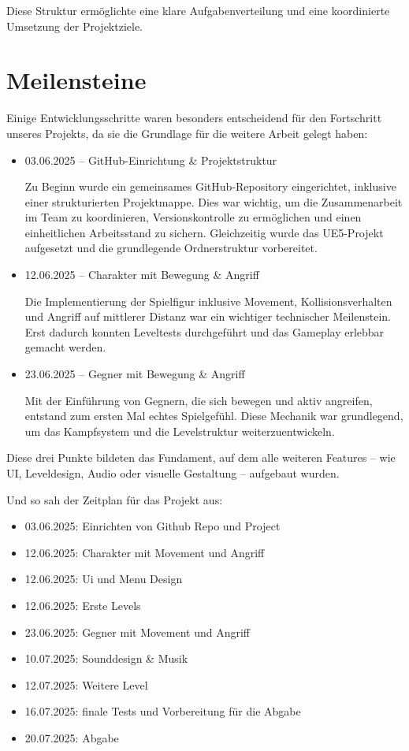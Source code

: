 \documentclass[oneside]{ausarbeitung}
\begin{document}
Diese Struktur ermöglichte eine klare Aufgabenverteilung und eine koordinierte Umsetzung der Projektziele.


\section{Meilensteine}
\label{sec:meilensteine}

Einige Entwicklungsschritte waren besonders entscheidend für den Fortschritt unseres Projekts, da sie die Grundlage für die weitere Arbeit gelegt haben:

\begin{itemize}
    \item 03.06.2025 – GitHub-Einrichtung & Projektstruktur
    
    Zu Beginn wurde ein gemeinsames GitHub-Repository eingerichtet, inklusive einer strukturierten Projektmappe. Dies war wichtig, um die Zusammenarbeit im Team zu koordinieren, Versionskontrolle zu ermöglichen und einen einheitlichen Arbeitsstand zu sichern. Gleichzeitig wurde das UE5-Projekt aufgesetzt und die grundlegende Ordnerstruktur vorbereitet.
    
    \item 12.06.2025 – Charakter mit Bewegung & Angriff
    
    Die Implementierung der Spielfigur inklusive Movement, Kollisionsverhalten und Angriff auf mittlerer Distanz war ein wichtiger technischer Meilenstein. Erst dadurch konnten Leveltests durchgeführt und das Gameplay erlebbar gemacht werden.
    
    \item 23.06.2025 – Gegner mit Bewegung & Angriff
    
    Mit der Einführung von Gegnern, die sich bewegen und aktiv angreifen, entstand zum ersten Mal echtes Spielgefühl. Diese Mechanik war grundlegend, um das Kampfsystem und die Levelstruktur weiterzuentwickeln.
\end{itemize}

Diese drei Punkte bildeten das Fundament, auf dem alle weiteren Features – wie UI, Leveldesign, Audio oder visuelle Gestaltung – aufgebaut wurden.

Und so sah der Zeitplan für das Projekt aus:

\begin{itemize}
    \item 03.06.2025: Einrichten von Github Repo und Project
    \item 12.06.2025: Charakter mit Movement und Angriff
    \item 12.06.2025: Ui und Menu Design
    \item 12.06.2025: Erste Levels
    \item 23.06.2025: Gegner mit Movement und Angriff
    \item 10.07.2025: Sounddesign & Musik
    \item 12.07.2025: Weitere Level
    \item 16.07.2025: finale Tests und Vorbereitung für die Abgabe
    \item 20.07.2025: Abgabe
\end{itemize}
\end{document}
